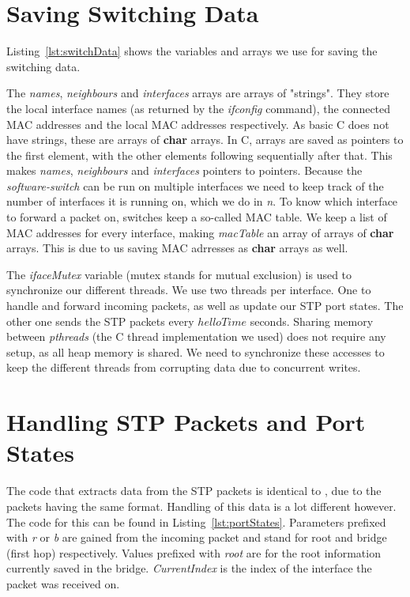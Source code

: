 \section{Saving Switching Data}
Listing~\ref{lst:switchData} shows the variables and arrays we use for saving the switching data.

The \textit{names}, \textit{neighbours} and \textit{interfaces} arrays are arrays of "strings".
They store the local interface names (as returned by the \textit{ifconfig} command), the connected MAC addresses and the local MAC addresses respectively.
As basic C does not have strings, these are arrays of \textbf{char} arrays.
In C, arrays are saved as pointers to the first element, with the other elements following sequentially after that.
This makes \textit{names}, \textit{neighbours} and \textit{interfaces} pointers to pointers.
Because the \textit{software-switch} can be run on multiple interfaces we need to keep track of the number of interfaces it is running on, which we do in \textit{n}.
To know which interface to forward a packet on, switches keep a so-called MAC table.
We keep a list of MAC addresses for every interface, making \textit{macTable} an array of arrays of \textbf{char} arrays.
This is due to us saving MAC adrresses as \textbf{char} arrays as well.

The \textit{ifaceMutex} variable (mutex stands for mutual exclusion) is used to synchronize our different threads.
We use two threads per interface.
One to handle and forward incoming packets, as well as update our STP port states.
The other one sends the STP packets every $helloTime$ seconds.
Sharing memory between \textit{pthreads} (the C thread implementation we used) does not require any setup, as all heap memory is shared\cite{pthreads}.
We need to synchronize these accesses to keep the different threads from corrupting data due to concurrent writes.

\section{Handling STP Packets and Port States}
The code that extracts data from the STP packets is identical to \tool, due to the packets having the same format.
Handling of this data is a lot different however.
The code for this can be found in Listing~\ref{lst:portStates}.
Parameters prefixed with \textit{r} or \textit{b} are gained from the incoming packet and stand for root and bridge (first hop) respectively.
Values prefixed with \textit{root} are for the root information currently saved in the bridge.
\textit{CurrentIndex} is the index of the interface the packet was received on.



